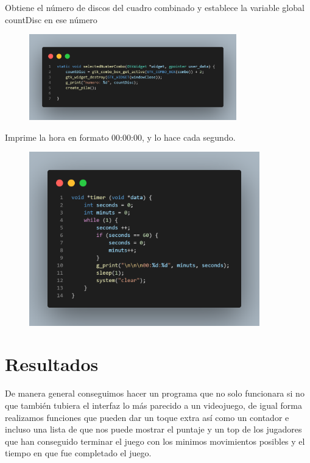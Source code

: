 \documentclass[letterpaper,12pt]{extarticle}%
\begin{document}
\begin{multicols}{2}
			Obtiene el número de discos del cuadro combinado y establece
			la variable global countDisc en ese número
			\begin{figure}[H]
			\begin{center}
			\includegraphics[width=9cm]{imag//img7.png}
			\caption{}
			\label{algBinToDec}
			\end{center}
			\end{figure}

			Imprime la hora en formato 00:00:00, y lo hace cada segundo.
			\begin{figure}[H]
			\begin{center}
			\includegraphics[width=10cm]{imag//img8.png}
			\caption{}
			\label{algBcdToDec}
			\end{center}
			\end{figure}
    
    	
    \section{Resultados}
		 De manera general conseguimos hacer un programa que no solo funcionara si no que
		 también tubiera el interfaz lo más parecido a un videojuego, de igual forma 
		 realizamos funciones que pueden dar un toque extra así como un contador e incluso
		 una lista de que nos puede mostrar el puntaje y un top de los jugadores que han 
		 conseguido terminar el juego con los minimos movimientos posibles y el tiempo en 
		 que fue completado el juego.

		

	    \end{multicols}
\end{document}
